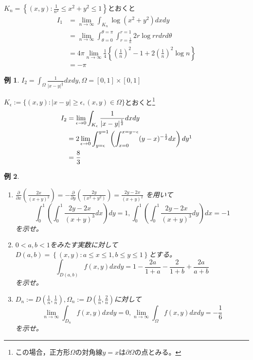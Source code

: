 \documentclass[dvipdfmx,a4j,10pt]{jsarticle}
\makeatletter
\theoremstyle{mystyle1}
\theoremstyle{mystyle2}
\newtheorem{example}{例}
\newtheorem{ans}{解答}
\renewenvironment{ans}[1][解答]{\par
  \pushQED{\qed}%
  \normalfont
  \topsep6\p@\@plus6\p@ \trivlist
  \item[\hskip\labelsep{\bfseries\sffamily #1}]\ignorespaces
}{%
  \popQED\endtrivlist\@endpefalse
}
\makeatother
\begin{document}
\begin{ans}
$K_n=\left\{(x,y):\frac{1}{n^2}\leq x^2+y^2\leq 1\right\}$とおくと
\[
\begin{split}
	I_1
	&=\lim_{n\to\infty}\int_{K_n}\log{(x^2+y^2)}dxdy\\
	&=\lim_{n\to\infty}\int_{\theta=0}^{\theta=\pi}\int_{r=\frac{1}{n}}^{r=1}2r\log{r} rdrd\theta\\
	&=4\pi\lim_{n\to\infty}\frac{1}{4}\left\{\left(\frac{1}{n}\right)^2-1+2\left(\frac{1}{n}\right)^2\log{n}\right\}\\
	&=-\pi
\end{split}
\]
\end{ans}

\begin{example}
	$\displaystyle I_2=\int_\Omega\frac{1}{|x-y|^{\frac{1}{2}}}dxdy,\Omega=[0,1]\times[0,1]$
\end{example}

\begin{ans}
	$K_\epsilon:=\{(x,y):|x-y|\geq\epsilon,(x,y)\in\Omega\}$とおくと\footnote{この場合，正方形$\Omega$の対角線$y=x$は$\partial\Omega$の点とみる。}
	\[
	\begin{split}
		I_2
		&=\lim_{\epsilon\to0}\int_{K_\epsilon}\frac{1}{|x-y|^\frac{1}{2}}dxdy\\
		&=2\lim_{\epsilon\to0}\int_{y=\epsilon}^{y=1}\left(\int_{x=0}^{x=y-\epsilon}(y-x)^{-\frac{1}{2}}dx\right)dy\footnotemark\\
		&=\frac{8}{3}
	\end{split}
	\]
\end{ans}

\newpage

\begin{example}\
	\begin{enumerate}\renewcommand{\labelenumi}{(\arabic{enumi})}
	\item $\displaystyle\frac{\partial}{\partial x}\left(\frac{2x}{(x+y)^2}\right)=-\frac{\partial}{\partial y}\left(\frac{2y}{(x^2+y^2)}\right)=\frac{2y-2x}{(x+y)^2}$
		を用いて
		\[
        \displaystyle\int_0^1\left(\int_0^1\frac{2y-2x}{(x+y)^3}dx\right)dy =1, \int_0^1\left(\int_0^1\frac{2y-2x}{(x+y)^3}dy\right)dx =-1
        \]
        を示せ。

	\item
	$0<a,b<1$をみたす実数に対して$D(a,b)=\left\{(x,y):a\leq x\leq 1,b\leq y\leq 1\right\}$とする。
	\[
		\int_{D(a,b)}f(x,y)dxdy=1-\frac{2a}{1+a}-\frac{2}{1+b}+\frac{2a}{a+b}
	\]
    を示せ。
	\item $\displaystyle D_n:=D\left(\frac{1}{n},\frac{1}{n}\right),\Omega_n:=D\left(\frac{1}{n},\frac{2}{n}\right)$に対して
	\[
		\lim_{n\to\infty}\int_{D_n}f(x,y)dxdy=0,\lim_{n\to\infty}\int_\Omega f(x,y)dxdy=-\frac{1}{6}
	\]
    を示せ。
	\end{enumerate}

\end{example}
\end{document}
